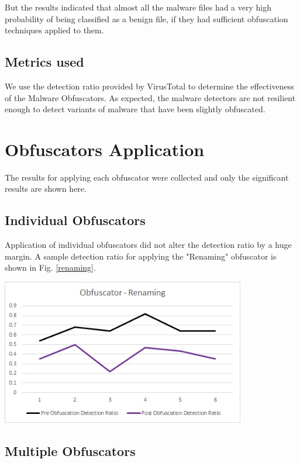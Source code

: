 But the results indicated that almost all the malware files had a very high probability of being classified as a benign file, if they had sufficient obfuscation techniques applied to them.

\subsection{Metrics used}
We use the detection ratio provided by VirusTotal to determine the effectiveness of the Malware Obfuscators. As expected, the malware detectors are not resilient enough to detect variants of malware that have been slightly obfuscated.

\section{Obfuscators Application}

The results for applying each obfuscator were collected and only the significant results are shown here.

\subsection{Individual Obfuscators}

Application of individual obfuscators did not alter the detection ratio by a huge margin. A sample detection ratio for applying the "Renaming" obfuscator is shown in Fig. \ref{renaming}.

	 \vspace{3mm}
	 \begin{center}
	 	\includegraphics[width=0.8\textwidth]{renaming.jpg}
	 	\label{renaming}
	 \end{center}
	 \vspace{3mm}
	 
\subsection{Multiple Obfuscators}

